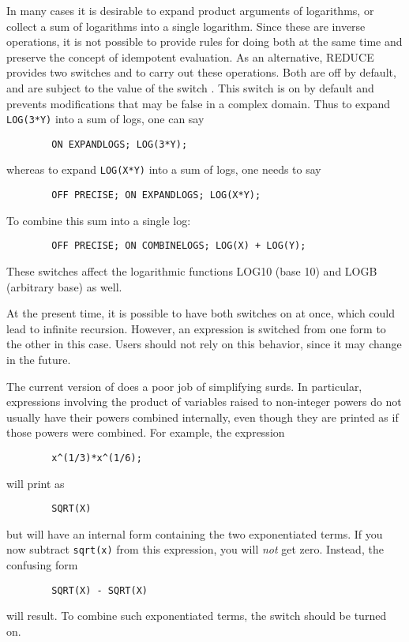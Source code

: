 \hypertarget{switch:COMBINELOGS}{}
\hypertarget{switch:EXPANDLOGS}{}
In many cases it is desirable to expand product arguments of logarithms,
or collect a sum of logarithms into a single logarithm.  Since these are
inverse operations, it is not possible to provide rules for doing both at
the same time and preserve the {\REDUCE} concept of idempotent evaluation.
As an alternative, REDUCE provides two switches
 and
 to carry
out these operations.  Both are off by default, and are subject
to the value of the switch . This switch is on
by default and prevents modifications that may be false in a complex domain.
Thus to expand \texttt{LOG(3*Y)} into a sum of logs, one can say
\begin{verbatim}
        ON EXPANDLOGS; LOG(3*Y);
\end{verbatim}
whereas to expand \texttt{LOG(X*Y)} into a sum of logs, one needs to say
\begin{verbatim}
        OFF PRECISE; ON EXPANDLOGS; LOG(X*Y);
\end{verbatim}
To combine this sum into a single log:
\begin{verbatim}
        OFF PRECISE; ON COMBINELOGS; LOG(X) + LOG(Y);
\end{verbatim}

These switches affect the logarithmic functions LOG10 (base 10) and LOGB
(arbitrary base) as well.

At the present time, it is possible to have both switches on at once,
which could lead to infinite recursion.  However, an expression is
switched from one form to the other in this case.  Users should not rely
on this behavior, since it may change in the future.

\hypertarget{switch:COMBINEEXPT}{}
The current version of {\REDUCE} does a poor job of simplifying surds.  In
particular, expressions involving the product of variables raised to
non-integer powers do not usually have their powers combined internally,
even though they are printed as if those powers were combined.  For
example, the expression
\begin{verbatim}
        x^(1/3)*x^(1/6);
\end{verbatim}
will print as
\begin{verbatim}
        SQRT(X)
\end{verbatim}
but will have an internal form containing the two exponentiated terms.
If you now subtract \texttt{sqrt(x)} from this expression, you will
\emph{not} get zero.  Instead, the confusing form
\begin{verbatim}
        SQRT(X) - SQRT(X)
\end{verbatim}
will result.  To combine such exponentiated terms, the switch
 should be turned on.

